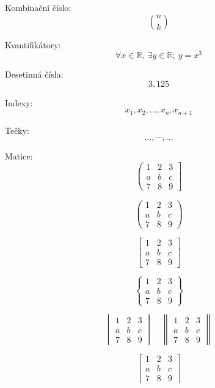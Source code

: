 \documentclass[a4paper, 12pt]{article}
\begin{document}
Kombinační číslo:
$$ \binom{n}{k} $$

Kvantifikátory:
$$ \forall{x} \in \mathbb{R},\ \exists{y} \in \mathbb{R}; \ y = x ^ 3$$

Desetinná čísla:
$$ 3{,}125 $$

Indexy:
$$ x_1, x_2, \dots, x_n, x_{n+1} $$

Tečky:
$$ \dots, \cdots, \ldots $$

Matice:
$$
    \left(
    \begin{matrix}
        1 & 2 & 3 \\
        a & b & c \\
        7 & 8 & 9
    \end{matrix}
    \right]
$$

$$
    \begin{pmatrix}
        1 & 2 & 3 \\
        a & b & c \\
        7 & 8 & 9
    \end{pmatrix}
$$

$$
    \begin{bmatrix}
        1 & 2 & 3 \\
        a & b & c \\
        7 & 8 & 9
    \end{bmatrix}
$$

$$
    \begin{Bmatrix}
        1 & 2 & 3 \\
        a & b & c \\
        7 & 8 & 9
    \end{Bmatrix}
$$

$$
    \begin{vmatrix}
        1 & 2 & 3 \\
        a & b & c \\
        7 & 8 & 9
    \end{vmatrix}
    \quad %
    \begin{Vmatrix}
        1 & 2 & 3 \\
        a & b & c \\
        7 & 8 & 9
    \end{Vmatrix}
$$

$$
    \left \lceil
    \begin{matrix}
        1 & 2 & 3 \\
        a & b & c \\
        7 & 8 & 9
    \end{matrix}
    \right \rceil
$$
\end{document}
